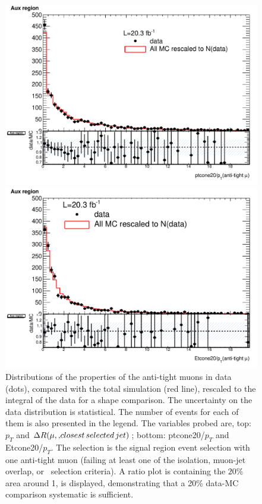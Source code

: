 \begin{figure}[!htbp]
\begin{minipage}[h]{0.5\textwidth}
    \centering \includegraphics[width=\textwidth]{figs/fake/h_relptcone20_CR_early_AF2_extrap_MET50_noIso_RESCALED}
  \end{minipage}\hfill
  \begin{minipage}[h]{0.5\textwidth}
    \centering \includegraphics[width=\textwidth]{figs/fake/h_reletcone20_CR_early_AF2_extrap_MET50_noIso_RESCALED}
  \end{minipage}\hfill
  \caption{Distributions of the properties of the anti-tight muons in data (dots), compared with the total simulation (red line), rescaled to the integral of the data for a shape comparison. The uncertainty on the data distribution is statistical. The number of events for each of them is also presented in the legend. The variables probed are, top: $p_T$ and $\Delta R(\mu, {\rm , closest \, selected \, jet})$; bottom: ptcone20/$p_T$ and Etcone20/$p_T$. The selection is the signal region event selection with one anti-tight muon (failing at least one of the isolation, muon-jet overlap, or \pt\ selection criteria). A ratio plot is containing the $20\%$ area around 1, is displayed, demonstrating that a 20\% data-MC comparison systematic is sufficient.}
  \label{figure:background_muon_dataMC}
\end{figure} 


